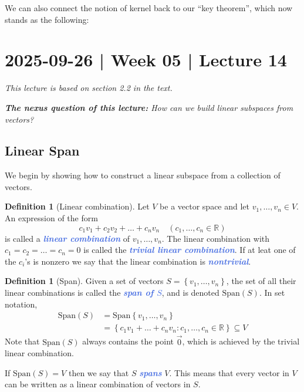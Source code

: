 \documentclass[10pt]{article}
\newcommand{\demph}[1]{\textcolor{RoyalBlue}{\textbf{\slshape #1}}} %
\theoremstyle{definition}
\newtheorem{definition}[theorem]{Definition}
\newcommand{\R}{\mathbb{R}}           %
\newcommand{\Span}{\mathrm{Span}} %
\begin{document}
We can also connect the notion of kernel back to our ``key theorem'', which
now stands as the following:


\newpage
\section{2025-09-26 | Week 05 | Lecture 14}
\textit{This lecture is based on section 2.2 in the text.}

\begin{center}
  \begin{tcolorbox}[width=0.9\textwidth, colback=white, colframe=black]
    \textit{\textbf{The nexus question of this lecture:} How can we build
      linear subspaces from vectors?}
  \end{tcolorbox}
\end{center}


\subsection{Linear Span}

We begin by showing how to construct a linear subspace from a collection of
vectors.

\begin{definition}[Linear combination]
  \label{def:linear-combination}
  Let $V$ be a vector space and let $v_{1},\ldots,v_{n}\in V$. An expression
  of the form
  \begin{equation*}
    c_{1}v_{1}+c_{2}v_{2}+\ldots+c_{n}v_{n} \quad (c_{1},\ldots,c_{n}\in \R)
  \end{equation*}
  is called a \demph{linear combination} of $v_{1},\ldots,v_{n}$. The linear
  combination with $c_{1}=c_{2}=\ldots=c_{n}=0$ is called the \demph{trivial
    linear combination}. If at leat one of the $c_{i}$'s is nonzero we say
  that the linear combination is \demph{nontrivial}.
\end{definition}

\begin{definition}[Span]
  \label{def:span}
  Given a set of vectors $S=\left\{v_{1},\ldots,v_{n}\right\} $, the set of all their linear
  combinations is called the \demph{span of $S$}, and is denoted $\Span(S)$.
  In set notation,
  \begin{align*}
    \Span(S) 
    &= \Span\left\{v_{1},\ldots,v_{n}\right\} \\
    &= \left\{c_{1}v_{1}+\ldots+c_{n}v_{n}: c_{1},\ldots,c_{n}\in \R\right\} \subseteq V
  \end{align*}
  Note that $\Span(S)$ always contains the point $\vec{0}$, which is achieved
  by the trivial linear combination.
  
  If $\Span(S) = V$ then we say that $S$ \demph{spans} $V$. This means that
  every vector in $V$ can be written as a linear combination of vectors in
  $S$.
\end{definition}
\end{document}
